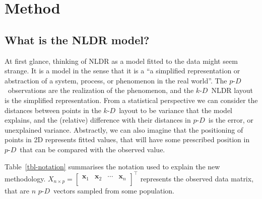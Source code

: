 \documentclass[
  12pt]{article}
\newcommand\pD{$p\text{-}D$\ }
\newcommand\kD{$k\text{-}D$\ }
\begin{document}
\section{Method}\label{sec-method}

\subsection{What is the NLDR model?}\label{what-is-the-nldr-model}

At first glance, thinking of NLDR as a model fitted to the data might
seem strange. It is a model in the sense that it is a ``a simplified
representation or abstraction of a system, process, or phenomenon in the
real world''. The \pD observations are the realization of the
phenomenon, and the \kD NLDR layout is the simplified representation.
From a statistical perspective we can consider the distances between
points in the \kD layout to be variance that the model explains, and the
(relative) difference with their distances in \pD is the error, or
unexplained variance. Abstractly, we can also imagine that the
positioning of points in 2D represents fitted values, that will have
some prescribed position in \pD that can be compared with the observed
value.

Table~\ref{tbl-notation} summarises the notation used to explain the new
methodology.
\(X_{n \times p} = \begin{bmatrix} \textbf{x} _{1} & \textbf{x}_ {2} & \cdots & \textbf{x}_{n} \\  \end{bmatrix}^\top\)
represents the observed data matrix, that are \(n\) \pD vectors sampled
from some population.
\end{document}
